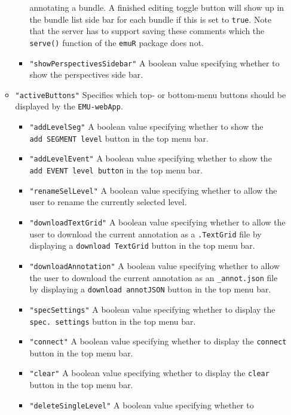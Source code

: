 \documentclass[]{book}
\begin{document}
\begin{itemize}
\begin{itemize}
\begin{itemize}
      annotating a bundle. A finished editing toggle button will
      show up in the bundle list side bar for each bundle if this
      is set to \texttt{true}. Note that the server has to support saving
      these comments which the \texttt{serve()} function of the \texttt{emuR}
      package does not.
    \item
      \texttt{"showPerspectivesSidebar"} A boolean value specifying
      whether to show the perspectives side bar.
    \end{itemize}
  \item
    \texttt{"activeButtons"} Specifies which top- or bottom-menu buttons
    should be displayed by the \texttt{EMU-webApp}.

    \begin{itemize}
    \item
      \texttt{"addLevelSeg"} A boolean value specifying whether to show
      the \texttt{add\ SEGMENT\ level} button in the top menu bar.
    \item
      \texttt{"addLevelEvent"} A boolean value specifying whether to show
      the \texttt{add\ EVENT\ level\ button} in the top menu bar.
    \item
      \texttt{"renameSelLevel"} A boolean value specifying whether to
      allow the user to rename the currently selected level.
    \item
      \texttt{"downloadTextGrid"} A boolean value specifying whether to
      allow the user to download the current annotation as a
      \texttt{.TextGrid} file by displaying a \texttt{download\ TextGrid} button
      in the top menu bar.
    \item
      \texttt{"downloadAnnotation"} A boolean value specifying whether to
      allow the user to download the current annotation as an
      \texttt{\_annot.json} file by displaying a \texttt{download\ annotJSON}
      button in the top menu bar.
    \item
      \texttt{"specSettings"} A boolean value specifying whether to
      display the \texttt{spec.\ settings} button in the top menu bar.
    \item
      \texttt{"connect"} A boolean value specifying whether to display
      the \texttt{connect} button in the top menu bar.
    \item
      \texttt{"clear"} A boolean value specifying whether to display the
      \texttt{clear} button in the top menu bar.
    \item
      \texttt{"deleteSingleLevel"} A boolean value specifying whether to

\end{itemize}
\end{itemize}
\end{itemize}
\end{document}
